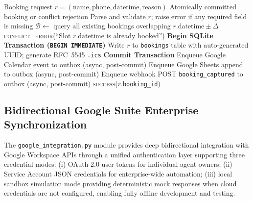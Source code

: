 \documentclass[11pt,a4paper]{article}
\begin{document}
\begin{algorithm}[htbp]
\caption{Deterministic ACID Booking Engine}
\label{alg:booking}
\begin{algorithmic}[1]
\Require Booking request $r = (\text{name}, \text{phone}, \text{datetime}, \text{reason})$
\Ensure Atomically committed booking or conflict rejection
\State Parse and validate $r$; raise error if any required field is missing
\State $\mathcal{B} \leftarrow$ query all existing bookings overlapping $r.\text{datetime} \pm \Delta$
        \State \Return \textsc{conflict\_error}(``Slot $r.\text{datetime}$ is already booked'')
    \EndIf
\EndFor
\State \textbf{Begin SQLite Transaction (\texttt{BEGIN IMMEDIATE})}
\State Write $r$ to \texttt{bookings} table with auto-generated UUID; generate RFC~5545 \texttt{.ics}
\State \textbf{Commit Transaction} 
\State Enqueue Google Calendar event to outbox (async, post-commit)
\State Enqueue Google Sheets append to outbox (async, post-commit)
\State Enqueue webhook POST \texttt{booking\_captured} to outbox (async, post-commit)
\State \Return \textsc{success}($r$.\texttt{booking\_id})
\end{algorithmic}
\end{algorithm}

\subsection{Bidirectional Google Suite Enterprise Synchronization}
\label{subsec:google_suite}

The \texttt{google\_integration.py} module provides deep bidirectional integration with Google Workspace APIs through a unified authentication layer supporting three credential modes: (i) OAuth 2.0 user tokens for individual agent owners; (ii) Service Account JSON credentials for enterprise-wide automation; (iii) local sandbox simulation mode providing deterministic mock responses when cloud credentials are not configured, enabling fully offline development and testing.
\end{document}
